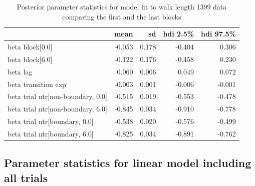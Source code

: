 \begin{table}[H]
    \centering
    \begin{tabular}{lrrrr}
        \toprule
         & mean & sd & hdi 2.5\% & hdi 97.5\% \\
        \midrule
        beta block[0.0] & -0.053 & 0.178 & -0.404 & 0.306 \\
        beta block[6.0] & -0.122 & 0.176 & -0.458 & 0.230 \\
        beta lag & 0.060 & 0.006 & 0.049 & 0.072 \\
        beta transition exp & -0.003 & 0.001 & -0.006 & -0.001 \\
        beta trial ntr[non-boundary, 0.0] & -0.515 & 0.019 & -0.553 & -0.478 \\
        beta trial ntr[non-boundary, 6.0] & -0.845 & 0.034 & -0.910 & -0.778 \\
        beta trial ntr[boundary, 0.0] & -0.538 & 0.020 & -0.576 & -0.499 \\
        beta trial ntr[boundary, 6.0] & -0.825 & 0.034 & -0.891 & -0.762 \\
        \bottomrule
    \end{tabular}        
    \caption{Posterior parameter statistics for model fit to walk length 1399 data comparing the first and the last blocks}
    \label{tab:first-last-blocks-1399}    
\end{table}


\subsection*{Parameter statistics for linear model including all trials}

